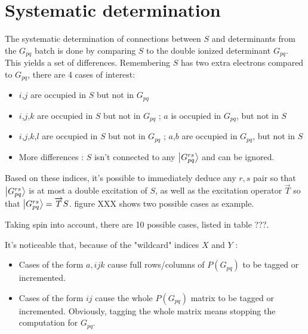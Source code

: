 \documentclass[./thesis.tex]{subfiles}
\begin{document}
\section{Systematic determination}

The systematic determination of connections between $S$ and determinants from the $G_{pq}$ batch is done by comparing $S$ to the double ionized determinant $G_{pq}$. This yields a set of differences. Remembering $S$ has two extra electrons compared to $G_{pq}$, there are 4 cases of interest:
\begin{itemize}

\item
$i$,$j$ are occupied in $S$ but not in $G_{pq}$
\item
$i$,$j$,$k$ are occupied in $S$ but not in $G_{pq}$ ; $a$ is occupied in $G_{pq}$, but not in $S$
\item
$i$,$j$,$k$,$l$ are occupied in $S$ but not in $G_{pq}$ ; $a$,$b$ are occupied in $G_{pq}$, but not in $S$
\item
More differences : $S$ isn't connected to any $\ket {G_{pq}^{rs}}$ and can be ignored. 

\end{itemize}

Based on these indices, it's possible to immediately deduce any $r,s$ pair so that $\ket {G_{pq}^{rs}}$ is at most a double excitation of $S$, as well as the excitation operator $\overrightarrow{T}$ so that $\ket {G_{pq}^{rs}}=\overrightarrow{T}S$. figure XXX shows two possible cases as example.

Taking spin into account, there are 10 possible cases, listed in table ???.


It's noticeable that, because of the "wildcard" indices $X$ and $Y$ :
\begin{itemize}

\item
Cases of the form $a,ijk$ cause full rows/columns of $P(G_{pq})$ to be tagged or incremented.
\item
Cases of the form $ij$ cause the whole $P(G_{pq})$ matrix to be tagged or incremented. Obviously, tagging the whole matrix means stopping the computation for $G_{pq}$.
\end{itemize}
\end{document}
